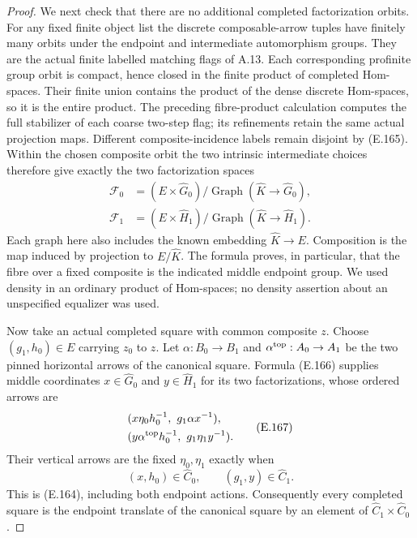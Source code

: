 \begin{proof}
We next check that there are no additional completed
factorization orbits.  For any fixed finite object list the
discrete composable-arrow tuples have finitely many orbits
under the endpoint and intermediate automorphism groups.
They are the actual finite labelled matching flags of A.13.
Each corresponding profinite group orbit is compact, hence
closed in the finite product of completed Hom-spaces.
Their finite union contains the product of the dense
discrete Hom-spaces, so it is the entire product.  The preceding fibre-product calculation
computes the full stabilizer of each coarse two-step flag;
its refinements retain the same actual projection maps.  Different composite-incidence
labels remain disjoint by (E.165).  Within the chosen
composite orbit the two intrinsic intermediate choices
therefore give exactly the two factorization spaces
\[
 \begin{split}
 \mathcal F_0&=(E\times\widehat G_0)\big/
        \operatorname{Graph}(\widehat K\to\widehat G_0),\\
 \mathcal F_1&=(E\times\widehat H_1)\big/
        \operatorname{Graph}(\widehat K\to\widehat H_1).
 \end{split}                                                  \tag{E.166}
\]
Each graph here also includes the known embedding
$\widehat K\to E$.  Composition is the map induced by
projection to $E/\widehat K$.  The formula proves, in
particular, that the fibre over a fixed composite is the
indicated middle endpoint group.  We used density in an
ordinary product of Hom-spaces; no density assertion about
an unspecified equalizer was used.

Now take an actual completed square with common composite
$z$.  Choose $(g_1,h_0)\in E$ carrying $z_0$ to $z$.
Let $\alpha:B_0\to B_1$ and
$\alpha^{\rm top}:A_0\to A_1$ be the two pinned horizontal
arrows of the canonical square.  Formula (E.166) supplies
middle coordinates $x\in\widehat G_0$ and
$y\in\widehat H_1$ for its two factorizations, whose
ordered arrows are
\[
 \begin{split}
 &(x\eta_0h_0^{-1},\ g_1\alpha x^{-1}),\\
 &(y\alpha^{\rm top}h_0^{-1},\ g_1\eta_1y^{-1}).
 \end{split}                                                  \tag{E.167}
\]
Their vertical arrows are the fixed $\eta_0,\eta_1$ exactly
when
\[
 (x,h_0)\in\widehat C_0,
          \qquad (g_1,y)\in\widehat C_1.                     \tag{E.168}
\]
This is (E.164), including both endpoint actions.
Consequently every completed square is the endpoint
translate of the canonical square by an element of
$\widehat C_1\times\widehat C_0$.


\end{proof}
